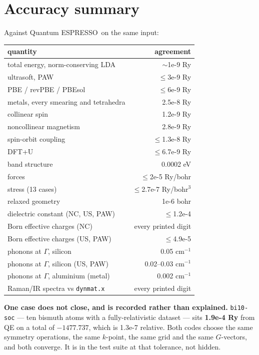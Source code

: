 \documentclass[11pt,a4paper]{article}
\newcommand{\qe}{Quantum ESPRESSO}
\newcommand{\code}[1]{\texttt{\small #1}}
\begin{document}
\section{Accuracy summary}

Against \qe\ on the same input:

\begin{center}
\small
\begin{tabular}{@{}lr@{}}
\toprule
\textbf{quantity} & \textbf{agreement} \\
\midrule
total energy, norm-conserving LDA & $\sim$1e-9 Ry \\
ultrasoft, PAW & $\le$3e-9 Ry \\
PBE / revPBE / PBEsol & $\le$6e-9 Ry \\
metals, every smearing and tetrahedra & 2.5e-8 Ry \\
collinear spin & 1.2e-9 Ry \\
noncollinear magnetism & 2.8e-9 Ry \\
spin-orbit coupling & $\le$1.3e-8 Ry \\
DFT+U & $\le$6.7e-9 Ry \\
\midrule
band structure & 0.0002 eV \\
forces & $\le$2e-5 Ry/bohr \\
stress (13 cases) & $\le$2.7e-7 Ry/bohr$^3$ \\
relaxed geometry & 1e-6 bohr \\
\midrule
dielectric constant (NC, US, PAW) & $\le$1.2e-4 \\
Born effective charges (NC) & every printed digit \\
Born effective charges (US, PAW) & $\le$4.9e-5 \\
phonons at $\Gamma$, silicon & 0.05 cm$^{-1}$ \\
phonons at $\Gamma$, silicon (US, PAW) & 0.02--0.03 cm$^{-1}$ \\
phonons at $\Gamma$, aluminium (metal) & 0.002 cm$^{-1}$ \\
Raman/IR spectra vs \code{dynmat.x} & every printed digit \\
\bottomrule
\end{tabular}
\end{center}

\textbf{One case does not close, and is recorded rather than explained.}
\code{bi10-soc} --- ten bismuth atoms with a fully-relativistic dataset --- sits
\textbf{1.9e-4 Ry} from QE on a total of $-1477.737$, which is 1.3e-7 relative.
Both codes choose the same symmetry operations, the same $k$-point, the same
grid and the same $G$-vectors, and both converge. It is in the test suite at
that tolerance, not hidden.
\end{document}
